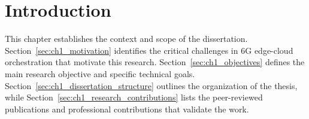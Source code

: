 \chapter{Introduction}
\label{ch:introduction}

This chapter establishes the context and scope of the dissertation. Section~\ref{sec:ch1_motivation} identifies the critical challenges in \ac{6G} edge-cloud orchestration that motivate this research. Section~\ref{sec:ch1_objectives} defines the main research objective and specific technical goals. Section~\ref{sec:ch1_dissertation_structure} outlines the organization of the thesis, while Section~\ref{sec:ch1_research_contributions} lists the peer-reviewed publications and professional contributions that validate the work.





